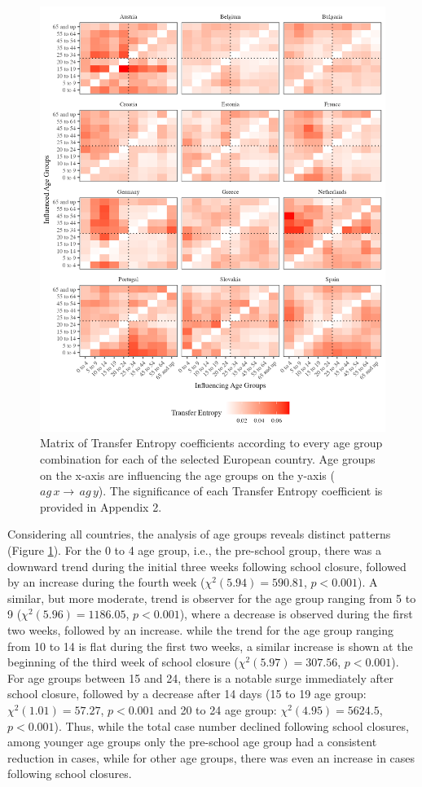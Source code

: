 \documentclass[]{interact}
\theoremstyle{plain}%
\theoremstyle{definition}
\theoremstyle{remark}
\begin{document}
\begin{figure}[H]
\includegraphics[width=\textwidth]{manuscript_files/figure-latex/te-1} \caption{Matrix of Transfer Entropy coefficients according to every age group combination for each of the selected European country. Age groups on the x-axis are influencing the age groups on the y-axis (\(ag\,x \rightarrow\,ag\,y\)). The significance of each Transfer Entropy coefficient is provided in Appendix 2.}\label{fig:te}
\end{figure}

Considering all countries, the analysis of age groups reveals distinct patterns (Figure \ref{fig:te}). For the 0 to 4 age group, i.e., the pre-school group, there was a downward trend during the initial three weeks following school closure, followed by an increase during the fourth week (\(\chi^2(5.94) = 590.81\), \(p < 0.001\)). A similar, but more moderate, trend is observer for the age group ranging from 5 to 9 (\(\chi^2(5.96) = 1186.05\), \(p < 0.001\)), where a decrease is observed during the first two weeks, followed by an increase. while the trend for the age group ranging from 10 to 14 is flat during the first two weeks, a similar increase is shown at the beginning of the third week of school closure (\(\chi^2(5.97) = 307.56\), \(p < 0.001\)). For age groups between 15 and 24, there is a notable surge immediately after school closure, followed by a decrease after 14 days (15 to 19 age group: \(\chi^2(1.01) = 57.27\), \(p < 0.001\) and 20 to 24 age group: \(\chi^2(4.95) = 5624.5\), \(p < 0.001\)). Thus, while the total case number declined following school closures, among younger age groups only the pre-school age group had a consistent reduction in cases, while for other age groups, there was even an increase in cases following school closures.
\end{document}
